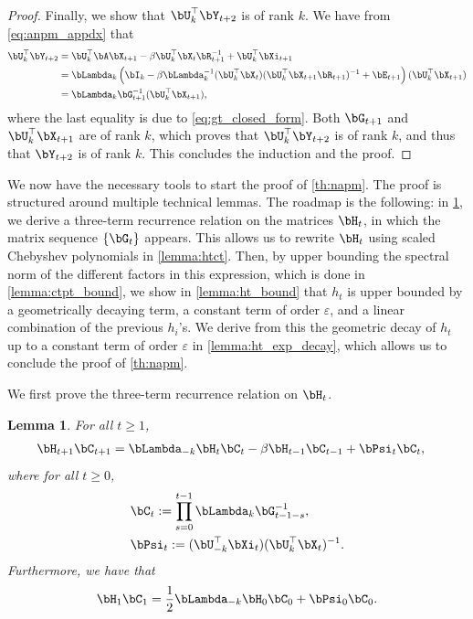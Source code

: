 \documentclass{article}
\theoremstyle{plain}
\newtheorem{lemma}[theorem]{Lemma}
\theoremstyle{definition}
\theoremstyle{remark}
\begin{document}
\begin{proof}
  Finally, we show that $\bU_k^\top\bY_{t+2}$ is of rank $k$. We have from \eqref{eq:anpm_appdx} that
  \begin{align}
    \bU_k^\top\bY_{t+2} & = \bU_k^\top\bA \bX_{t+1} - \beta \bU_k^\top \bX_{t} \bR_{t+1}^{-1} + \bU_k^\top\bXi_{t+1} \nonumber \\
    & = \bLambda_k \left( \bI_k - \beta\bLambda_k^{-1}(\bU_k^\top \bX_{t}) (\bU_k^\top \bX_{t+1}\bR_{t+1})^{-1} + \bE_{t+1}\right) (\bU_k^\top \bX_{t+1}) \nonumber \\
    & = \bLambda_k \bG_{t+1}^{-1} (\bU_k^\top \bX_{t+1}),
  \end{align}
  where the last equality is due to \eqref{eq:gt_closed_form}. Both $\bG_{t+1}$ and $\bU_k^\top \bX_{t+1}$ are of rank $k$, which proves that $\bU_k^\top \bY_{t+2}$ is of rank $k$, and thus that $\bY_{t+2}$ is of rank $k$. This concludes the induction and the proof.
\end{proof}

We now have the necessary tools to start the proof of \cref{th:napm}. The proof is structured around multiple technical lemmas. The roadmap is the following: in \cref{lemma:ht_3term}, we derive a three-term recurrence relation on the matrices $\bH_t$, in which the matrix sequence $\{\bG_t\}$ appears. This allows us to rewrite $\bH_t$ using scaled Chebyshev polynomials in \cref{lemma:htct}. Then, by upper bounding the spectral norm of the different factors in this expression, which is done in \cref{lemma:ctpt_bound}, we show in \cref{lemma:ht_bound} that $h_t$ is upper bounded by a geometrically decaying term, a constant term of order $\varepsilon$, and a linear combination of the previous $h_i$'s. We derive from this the geometric decay of $h_t$ up to a constant term of order $\varepsilon$ in \cref{lemma:ht_exp_decay}, which allows us to conclude the proof of \cref{th:napm}.

We first prove the three-term recurrence relation on $\bH_t$.

\begin{lemma}\label{lemma:ht_3term}
  For all $t\geqslant 1$,
  \begin{align}\label{eq:3termrec}
    &\bH_{t+1}\bC_{t+1} = \bLambda_{-k}  \bH_t \bC_t  - \beta \bH_{t-1}\bC_{t-1} + \bPsi_t \bC_{t},
  \end{align}
  where for all $t\geqslant 0$,
  \begin{align}
    & \bC_t := \prod_{s=0}^{t-1} \bLambda_k\bG_{t-1-s}^{-1}, \\
    & \bPsi_t :=  (\bU_{-k}^\top \bXi_t) (\bU_k^\top \bX_t)^{-1}. \label{eq:psi_def}
  \end{align}
  Furthermore, we have that
  \begin{align}\label{eq:3termrect1}
    \bH_1\bC_1 = \frac{1}{2}\bLambda_{-k}\bH_0 \bC_0+ \bPsi_0 \bC_0.
  \end{align}
\end{lemma}
\end{document}
